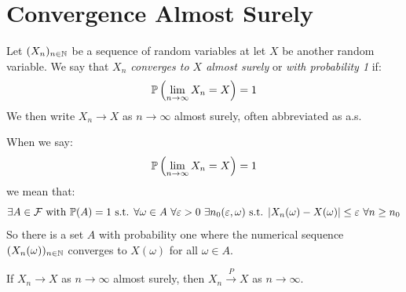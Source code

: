 \documentclass[../main.tex]{subfiles}
\begin{document}
\section{Convergence Almost Surely}
\begin{definition}
  Let $(X_n)_{n \in \N}$ be a sequence of random variables at let $X$ be another random variable.
  We say that \textit{$X_n$ converges to $X$ almost surely} or \textit{with probability 1} if:
  \[
    \P\left(\lim_{n \to \infty} X_n = X\right) = 1
  \]
  We then write $X_n \to X$ as $n \to \infty$ almost surely, often abbreviated as a.s.
\end{definition}
\begin{remark}
  When we say:
  \[
    \P\left(\lim_{n \to \infty} X_n = X\right) = 1
  \]
  we mean that:
  \[
    \exists A \in \salg \text{ with } \P(A) = 1 \text{ s.t. } \forall \omega \in A\ \forall \varepsilon > 0 \ \exists n_0(\varepsilon, \omega) \text{ s.t. } |X_n(\omega) - X(\omega)| \leq \varepsilon\ \forall n\geq n_0
  \]
  So there is a set $A$ with probability one where the numerical sequence $(X_n(\omega))_{n \in \N}$ converges to $X(\omega)$ for all $\omega \in A$.
\end{remark}
\begin{proposition}
  If $X_n \to X$ as $n \to \infty$ almost surely, then $X_n \xrightarrow{P} X$ as $n \to \infty$.
\end{proposition}
\end{document}
